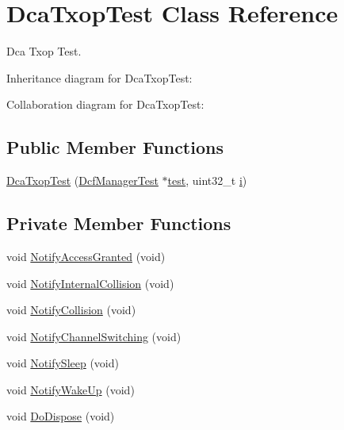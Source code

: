 \hypertarget{classDcaTxopTest}{}\section{Dca\+Txop\+Test Class Reference}
\label{classDcaTxopTest}


Dca Txop Test.  




Inheritance diagram for Dca\+Txop\+Test\+:


Collaboration diagram for Dca\+Txop\+Test\+:
\subsection*{Public Member Functions}
\begin{DoxyCompactItemize}
\item 
\hyperlink{classDcaTxopTest_aaf7f21bf569346f32a9a848c50746a58}{Dca\+Txop\+Test} (\hyperlink{classDcfManagerTest}{Dcf\+Manager\+Test} $\ast$\hyperlink{main-test-sync_8cc_a708a4c1a4d0c4acc4c447310dd4db27f}{test}, uint32\+\_\+t \hyperlink{lte__uplink__power__control_8m_a6f6ccfcf58b31cb6412107d9d5281426}{i})
\end{DoxyCompactItemize}
\subsection*{Private Member Functions}
\begin{DoxyCompactItemize}
\item 
void \hyperlink{classDcaTxopTest_a1bf2ad1cbdabe76f516ae825e2212417}{Notify\+Access\+Granted} (void)
\item 
void \hyperlink{classDcaTxopTest_a3e61a12ae20624fecf1ad3b3615242c5}{Notify\+Internal\+Collision} (void)
\item 
void \hyperlink{classDcaTxopTest_a47e4461e540be02e6425187ee1290ef1}{Notify\+Collision} (void)
\item 
void \hyperlink{classDcaTxopTest_a1abb82e146c0e121c8d4b020b06235ec}{Notify\+Channel\+Switching} (void)
\item 
void \hyperlink{classDcaTxopTest_a6b85caa1f9823cba649c43ce1d723688}{Notify\+Sleep} (void)
\item 
void \hyperlink{classDcaTxopTest_a033b160a927be509b80210ad9f208e0c}{Notify\+Wake\+Up} (void)
\item 
void \hyperlink{classDcaTxopTest_ac1a6b709c6c36f5bdf5d1a5ca9e639e3}{Do\+Dispose} (void)
\end{DoxyCompactItemize}
